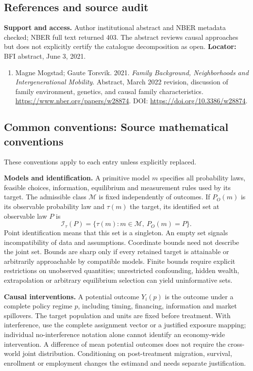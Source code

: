 \documentclass[11pt,a4paper]{article}
\begin{document}
\subsection*{References and source audit}
\textbf{Support and access.} Author institutional abstract and NBER metadata checked; NBER full text returned 403. The abstract reviews causal approaches but does not explicitly certify the catalogue decomposition as open. \textbf{Locator:} BFI abstract, June 3, 2021.
\begin{enumerate}\raggedright
\item\hypertarget{definitions:source:30007645:1}{} Magne Mogstad; Gaute Torsvik. 2021. \emph{Family Background, Neighborhoods and Intergenerational Mobility}. Abstract, March 2022 revision, discussion of family environment, genetics, and causal family characteristics.
\url{https://www.nber.org/papers/w28874}.
DOI: \url{https://doi.org/10.3386/w28874}.
\end{enumerate}

\subsection*{Common conventions: Source mathematical conventions}

These conventions apply to each entry unless explicitly replaced.

\textbf{Models and identification.} A primitive model \(m\) specifies all probability laws, feasible choices, information, equilibrium and measurement rules used by its target. The admissible class \(\mathcal M\) is fixed independently of outcomes. If \(P_O(m)\) is its observable probability law and \(\tau(m)\) the target, its identified set at observable law \(P\) is
\[
 \mathcal I_\tau(P)=\{\tau(m):m\in\mathcal M,\ P_O(m)=P\}.
\]
Point identification means that this set is a singleton. An empty set signals incompatibility of data and assumptions. Coordinate bounds need not describe the joint set. Bounds are sharp only if every retained target is attainable or arbitrarily approachable by compatible models. Finite bounds require explicit restrictions on unobserved quantities; unrestricted confounding, hidden wealth, extrapolation or arbitrary equilibrium selection can yield uninformative sets.

\textbf{Causal interventions.} A potential outcome \(Y_i(p)\) is the outcome under a complete policy regime \(p\), including timing, financing, information and market spillovers. The target population and units are fixed before treatment. With interference, use the complete assignment vector or a justified exposure mapping; individual no-interference notation alone cannot identify an economy-wide intervention. A difference of mean potential outcomes does not require the cross-world joint distribution. Conditioning on post-treatment migration, survival, enrollment or employment changes the estimand and needs separate justification.
\end{document}
